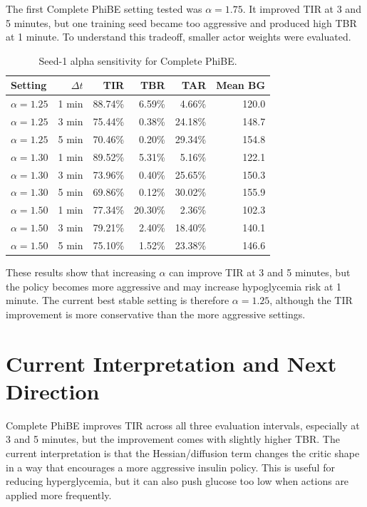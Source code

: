 \documentclass[11pt]{article}
\begin{document}
The first Complete PhiBE setting tested was \(\alpha=1.75\). It improved TIR at 3 and
5 minutes, but one training seed became too aggressive and produced high TBR at 1 minute.
To understand this tradeoff, smaller actor weights were evaluated.

\begin{table}[h]
\centering
\caption{Seed-1 alpha sensitivity for Complete PhiBE.}
\label{tab:alpha_sweep}
\begin{tabular}{lrrrrr}
\toprule
Setting & \(\Delta t\) & TIR & TBR & TAR & Mean BG \\
\midrule
\(\alpha=1.25\) & 1 min & 88.74\% & 6.59\% & 4.66\% & 120.0 \\
\(\alpha=1.25\) & 3 min & 75.44\% & 0.38\% & 24.18\% & 148.7 \\
\(\alpha=1.25\) & 5 min & 70.46\% & 0.20\% & 29.34\% & 154.8 \\
\midrule
\(\alpha=1.30\) & 1 min & 89.52\% & 5.31\% & 5.16\% & 122.1 \\
\(\alpha=1.30\) & 3 min & 73.96\% & 0.40\% & 25.65\% & 150.3 \\
\(\alpha=1.30\) & 5 min & 69.86\% & 0.12\% & 30.02\% & 155.9 \\
\midrule
\(\alpha=1.50\) & 1 min & 77.34\% & 20.30\% & 2.36\% & 102.3 \\
\(\alpha=1.50\) & 3 min & 79.21\% & 2.40\% & 18.40\% & 140.1 \\
\(\alpha=1.50\) & 5 min & 75.10\% & 1.52\% & 23.38\% & 146.6 \\
\bottomrule
\end{tabular}
\end{table}

These results show that increasing \(\alpha\) can improve TIR at 3 and 5 minutes, but the
policy becomes more aggressive and may increase hypoglycemia risk at 1 minute. The current
best stable setting is therefore \(\alpha=1.25\), although the TIR improvement is more
conservative than the more aggressive settings.

\section{Current Interpretation and Next Direction}

Complete PhiBE improves TIR across all three evaluation intervals, especially at 3 and
5 minutes, but the improvement comes with slightly higher TBR. The current interpretation
is that the Hessian/diffusion term changes the critic shape in a way that encourages a more
aggressive insulin policy. This is useful for reducing hyperglycemia, but it can also push
glucose too low when actions are applied more frequently.
\end{document}
